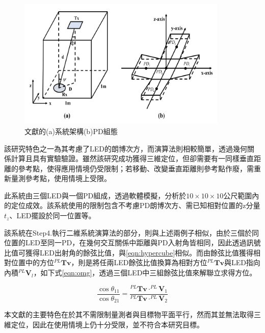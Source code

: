 \begin{description}
        \begin{figure}[htpb]
            \centering
            \includegraphics[width=10cm]{ch2pic/case_cart3d.png}
            \caption{文獻\cite{case:cart3d}的(a)系統架構(b)PD組態}
            \label{pic:case_cart3d}
        \end{figure}

        該研究特色之一為其考慮了LED的朗博次方，而演算法則相較簡單，透過幾何關係計算且具有實驗驗證。雖然該研究成功獲得三維定位，但卻需要有一同樣垂直距離的參考點，使得應用情境仍受限制；若移動、改變垂直距離則參考點作廢，需重新量測參考點，使用情境上受限。



        \item[\cite{omg_new}]\hfill
        
        此系統由三個LED與一個PD組成，透過軟體模擬，分析於$10\times 10\times 10$公尺範圍內的定位成效。該系統使用的限制包含不考慮PD朗博次方、需已知相對位置的z分量$t_z$、LED擺設於同一位置等。

        該系統在Step4.執行二維系統演算法的部分，則與上述兩例子相似，由於三個於同位置的LED至同一PD，在幾何交互關係中距離與PD入射角皆相同，因此透過訊號比值可獲得LED出射角的餘弦比值，與\ref{eqn:hypercube}相似。而由餘弦比值獲得相對位置中的方位$^{PL}\boldsymbol{Tv}$，則是將任兩LED餘弦比值換算為相對方位$^{PL}\boldsymbol{Tv}$與LED指向內積$^{PL}\boldsymbol{V}_l$，如下式\ref{eqn:omg}，透過三個LED中三組餘弦比值來解聯立求得方位。
        
        \begin{equation}
            \label{eqn:omg}
            \frac{\cos\theta_{11}}{\cos\theta_{21}}=\frac{^{PL}\boldsymbol{Tv}\cdot^{PL}\boldsymbol{V}_1 }{^{PL}\boldsymbol{Tv}\cdot^{PL}\boldsymbol{V}_2 }
        \end{equation}

        本文獻的主要特色在於其不需限制量測者與目標物平面平行，然而其並無法取得三維定位，因此在使用情境上仍十分受限，並不符合本研究目標。
        
        

    \end{description}

